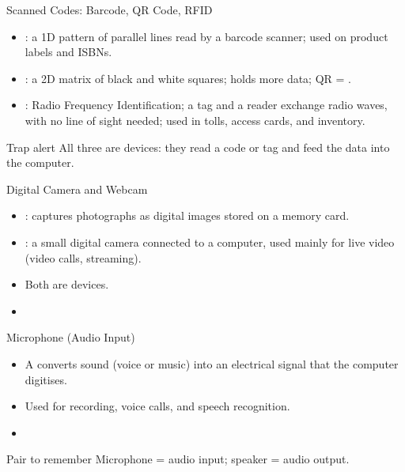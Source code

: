 \documentclass[aspectratio=169]{beamer}
\begin{document}
\begin{frame}{Scanned Codes: Barcode, QR Code, RFID}
  \begin{itemize}
    \item {}: a 1D pattern of parallel lines read by a barcode
      scanner; used on product labels and ISBNs.
    \item {}: a 2D matrix of black and white squares; holds more
      data; QR = .
    \item {}: Radio Frequency Identification; a tag and a reader
      exchange radio waves, with no line of sight needed; used in tolls,
      access cards, and inventory.
  \end{itemize}
  \begin{alertblock}{Trap alert}
    All three are  devices: they read a code or tag and feed the
    data into the computer.
  \end{alertblock}
\end{frame}

\begin{frame}{Digital Camera and Webcam}
  \begin{itemize}
    \item {}: captures photographs as digital images
      stored on a memory card.
    \item {}: a small digital camera connected to a computer,
      used mainly for live video (video calls, streaming).
    \item Both are  devices.
    \item {}
  \end{itemize}
\end{frame}

\begin{frame}{Microphone (Audio Input)}
  \begin{itemize}
    \item A  converts sound (voice or music) into an
      electrical signal that the computer digitises.
    \item Used for recording, voice calls, and speech recognition.
    \item {}
  \end{itemize}
  \begin{block}{Pair to remember}
    Microphone = audio input; speaker = audio output.
  \end{block}
\end{frame}
\end{document}
